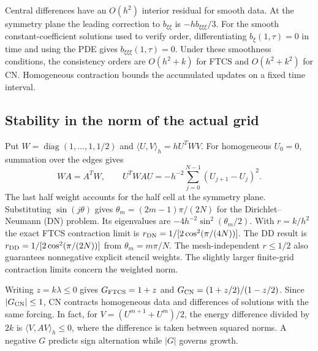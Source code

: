 \documentclass[11pt,a4paper]{article}
\begin{document}
Central differences have an $O(h^2)$ interior residual for smooth data. At the symmetry plane the leading correction to $b_{\xi\xi}$ is $-h b_{\xi\xi\xi}/3$. For the smooth constant-coefficient solutions used to verify order, differentiating $b_\xi(1,\tau)=0$ in time and using the PDE gives $b_{\xi\xi\xi}(1,\tau)=0$. Under these smoothness conditions, the consistency orders are $O(h^2+k)$ for FTCS and $O(h^2+k^2)$ for CN. Homogeneous contraction bounds the accumulated updates on a fixed time interval.

\subsection{Stability in the norm of the actual grid}
Put $W=\operatorname{diag}(1,\ldots,1,1/2)$ and $\langle U,V\rangle_h=hU^TWV$. For homogeneous $U_0=0$, summation over the edges gives
\begin{equation}\label{eq:energy}
WA=A^TW,\qquad U^TWAU=-h^{-2}\sum_{j=0}^{N-1}(U_{j+1}-U_j)^2.
\end{equation}
The last half weight accounts for the half cell at the symmetry plane. Substituting $\sin(j\theta)$ gives $\theta_m=(2m-1)\pi/(2N)$ for the Dirichlet--Neumann (DN) problem. Its eigenvalues are $-4h^{-2}\sin^2(\theta_m/2)$. With $r=k/h^2$ the exact FTCS contraction limit is $r_{\rm DN}=1/[2\cos^2(\pi/(4N))]$. The DD result is $r_{\rm DD}=1/[2\cos^2(\pi/(2N))]$ from $\theta_m=m\pi/N$. The mesh-independent $r\leq1/2$ also guarantees nonnegative explicit stencil weights. The slightly larger finite-grid contraction limits concern the weighted norm.

Writing $z=k\lambda\leq0$ gives $G_{\rm FTCS}=1+z$ and $G_{\rm CN}=(1+z/2)/(1-z/2)$. Since $|G_{\rm CN}|\leq1$, CN contracts homogeneous data and differences of solutions with the same forcing. In fact, for $V=(U^{m+1}+U^m)/2$, the energy difference divided by $2k$ is $\langle V,AV\rangle_h\leq0$, where the difference is taken between squared norms. A negative $G$ predicts sign alternation while $|G|$ governs growth.

\clearpage
\end{document}
